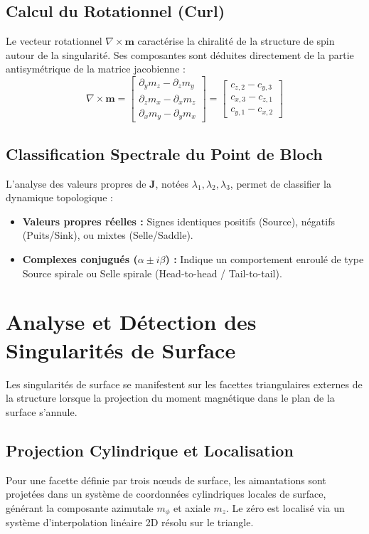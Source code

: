 \documentclass[11pt,a4paper]{article}
\begin{document}
\subsection{Calcul du Rotationnel (Curl)}
Le vecteur rotationnel $\nabla \times \mathbf{m}$ caractérise la chiralité de la structure de spin autour de la singularité. Ses composantes sont déduites directement de la partie antisymétrique de la matrice jacobienne :
\begin{equation}
\nabla \times \mathbf{m} = \begin{bmatrix}
\partial_y m_z - \partial_z m_y \\
\partial_z m_x - \partial_x m_z \\
\partial_x m_y - \partial_y m_x
\end{bmatrix} = \begin{bmatrix}
c_{z,2} - c_{y,3} \\
c_{x,3} - c_{z,1} \\
c_{y,1} - c_{x,2}
\end{bmatrix}
\end{equation}

\subsection{Classification Spectrale du Point de Bloch}
L'analyse des valeurs propres de $\mathbf{J}$, notées $\lambda_1, \lambda_2, \lambda_3$, permet de classifier la dynamique topologique :
\begin{itemize}
    \item \textbf{Valeurs propres réelles :} Signes identiques positifs (Source), négatifs (Puits/Sink), ou mixtes (Selle/Saddle).
    \item \textbf{Complexes conjugués ($\alpha \pm i\beta$) :} Indique un comportement enroulé de type Source spirale ou Selle spirale (Head-to-head / Tail-to-tail).
\end{itemize}

\section{Analyse et Détection des Singularités de Surface}
Les singularités de surface se manifestent sur les facettes triangulaires externes de la structure lorsque la projection du moment magnétique dans le plan de la surface s'annule.

\subsection{Projection Cylindrique et Localisation}
Pour une facette définie par trois nœuds de surface, les aimantations sont projetées dans un système de coordonnées cylindriques locales de surface, générant la composante azimutale $m_\phi$ et axiale $m_z$. Le zéro est localisé via un système d'interpolation linéaire 2D résolu sur le triangle.
\end{document}
